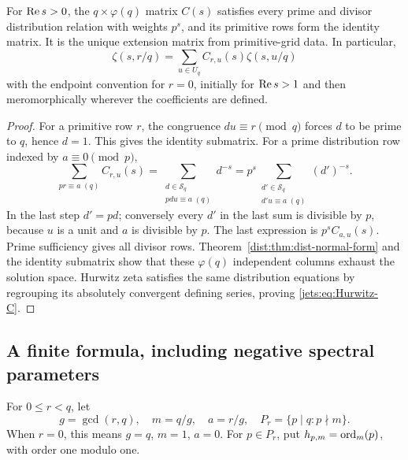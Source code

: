 \begin{theorem}\label{jets:thm:primitive}
For $\operatorname{Re} s>0$, the $q\times\varphi(q)$ matrix $C(s)$ satisfies every
prime and divisor distribution relation with weights $p^s$, and its
primitive rows form the identity matrix. It is the unique extension
matrix from primitive-grid data. In particular,
\begin{equation}\label{jets:eq:Hurwitz-C}
 \zeta(s,r/q)=\sum_{u\in U_q}C_{r,u}(s)\zeta(s,u/q)
\end{equation}
with the endpoint convention for $r=0$, initially for $\operatorname{Re} s>1$ and
then meromorphically wherever the coefficients are defined.
\end{theorem}
\begin{proof}
For a primitive row $r$, the congruence $du\equiv r\pmod q$ forces
$d$ to be prime to $q$, hence $d=1$. This gives the identity submatrix.
For a prime distribution row indexed by $a\equiv0\pmod p$,
\[
 \sum_{pr\equiv a\;(q)}C_{r,u}(s)
 =\sum_{\substack{d\in\mathcal S_q\\pdu\equiv a\;(q)}}d^{-s}
 =p^s\sum_{\substack{d'\in\mathcal S_q\\d'u\equiv a\;(q)}}(d')^{-s}.
\]
In the last step $d'=pd$; conversely every $d'$ in the last sum is
divisible by $p$, because $u$ is a unit and $a$ is divisible by $p$.
The last expression is $p^sC_{a,u}(s)$. Prime sufficiency gives all
divisor rows. Theorem~\ref{dist:thm:dist-normal-form} and the identity submatrix
show that these $\varphi(q)$ independent columns exhaust the solution
space. Hurwitz zeta satisfies the same distribution equations by
regrouping its absolutely convergent defining series, proving
\eqref{jets:eq:Hurwitz-C}.
\end{proof}

\subsection{A finite formula, including negative spectral parameters}
For $0\le r<q$, let
\[
 g=\gcd(r,q),\quad m=q/g,\quad a=r/g,
 \quad P_r=\{p\mid q:p\nmid m\}.
\]
When $r=0$, this means $g=q$, $m=1$, $a=0$.
For $p\in P_r$, put $h_{p,m}=\operatorname{ord}_m(p)$, with order one modulo one.

